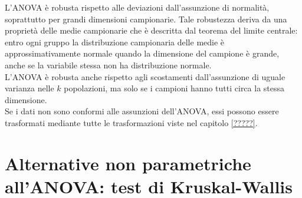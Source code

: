 \documentclass[10pt, draft]{book}
\begin{document}
L'ANOVA è robusta rispetto alle deviazioni dall'assunzione di normalità, soprattutto per grandi dimensioni campionarie. Tale robustezza deriva da una proprietà delle medie campionarie che è descritta dal teorema del limite centrale: entro ogni gruppo la distribuzione campionaria delle medie è approssimativamente normale quando la dimensione del campione è grande, anche se la variabile stessa non ha distribuzione normale.\\
L'ANOVA è robusta anche rispetto agli scostamenti dall'assunzione di uguale varianza nelle $k$ popolazioni, ma solo se i campioni hanno tutti circa la stessa dimensione.\\

Se i dati non sono conformi alle assunzioni dell'ANOVA, essi possono essere trasformati mediante tutte le trasformazioni viste nel capitolo \ref{?????}.

\section{Alternative non parametriche all'ANOVA: test di Kruskal-Wallis}
\end{document}

